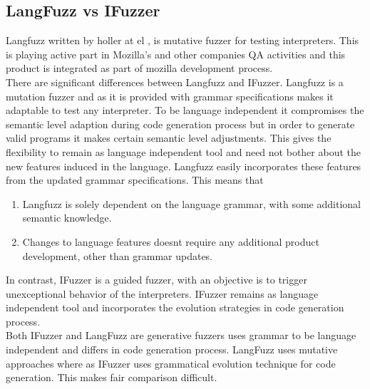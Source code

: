 \documentclass{acm_proc_article-sp}
\begin{document}
\subsection{LangFuzz vs IFuzzer}
Langfuzz written by holler at el \cite{Holler11}, is mutative fuzzer for testing interpreters. This is playing active part in Mozilla's and other companies QA activities and this product is integrated as part of mozilla development process.\\
\indent There are significant differences between Langfuzz and IFuzzer. Langfuzz is a mutation fuzzer and as it is provided with grammar specifications makes it adaptable to test any interpreter. To be language independent it compromises the semantic level adaption during code generation process but in order to generate valid programs it makes certain semantic level adjustments. This gives the flexibility to remain as language independent tool and need not bother about the new features induced in the language. Langfuzz easily incorporates these features from the updated grammar specifications. This means that

\begin{enumerate}
\item Langfuzz is solely dependent on the language grammar, with some additional semantic knowledge.
\item Changes to language features doesnt require any additional product development, other than grammar updates.
\end{enumerate}

\indent In contrast, IFuzzer is a guided fuzzer, with an objective is to trigger unexceptional behavior of the interpreters. IFuzzer remains as language independent tool and incorporates the evolution strategies in code generation process. \\
\indent Both IFuzzer and LangFuzz are generative fuzzers uses grammar to be language independent and differs in code generation process. LangFuzz uses mutative approaches where as IFuzzer uses grammatical evolution technique for code generation. This makes fair comparison difficult. 
\end{document}
